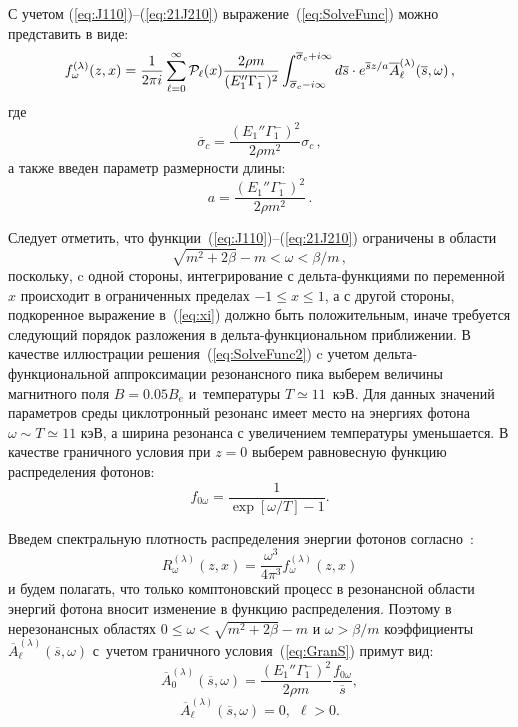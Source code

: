 \documentclass[14pt, russian]{article}
\begin{document}
С учетом (\ref{eq:J110})--(\ref{eq:21J210}) выражение~(\ref{eq:SolveFunc}) можно представить в виде:
\begin{equation}\label{eq:SolveFunc2}
	f_\omega^{(\lambda)}(z, x) = \frac{1}{2\pi i}\sum_{\ell=0}^{\infty} 
	{\cal P}_\ell(x) \frac{2\rho m}{(E_1''\Gamma_1^-)^2}\int_{\overline{\sigma}_c-i\infty}^{\overline{\sigma}_c + i \infty}d\overline{s} \cdot e^{\overline{s}z/a} \overline{A}^{(\lambda)}_\ell(\overline{s},\omega)\, ,
\end{equation}
где 
\begin{equation}
	\overline{\sigma}_c= \frac{(E_1''\Gamma_1^-)^2}{2\rho m^2} \sigma_c\, ,
\end{equation}
а также
введен параметр размерности длины:
\begin{equation}
	a=\frac{(E_1''\Gamma_1^-)^2}{2\rho m^ 2}\, .
\end{equation}

Следует отметить, что функции~(\ref{eq:J110})--(\ref{eq:21J210}) ограничены в области 
\begin{equation}
	\sqrt{m^2+2\beta}-m<\omega<\beta/m\, ,
\end{equation}
поскольку, c одной стороны, интегрирование с дельта-функциями по переменной~$x$ происходит в ограниченных пределах $-1\leqslant x\leqslant1$, а с другой стороны, подкоренное выражение в~(\ref{eq:xi}) должно быть положительным, иначе требуется следующий порядок разложения в дельта-функциональном приближении. В качестве иллюстрации решения~(\ref{eq:SolveFunc2}) c учетом дельта-функциональной аппроксимации резонансного пика выберем величины магнитного поля $B=0.05 B_e$ и~температуры $T\simeq11$~кэВ. Для данных значений параметров среды циклотронный резонанс имеет место на энергиях фотона $\omega\sim T\simeq11$ кэВ, а ширина резонанса с увеличением температуры уменьшается. В качестве граничного условия при $z=0$ выберем равновесную функцию распределения фотонов:
\begin{equation}
	f_{0\omega} = \frac{1}{\exp[\omega/T]-1}.
\end{equation}

 Введем спектральную плотность распределения энергии фотонов согласно~\cite{Landau:2002}:
\begin{equation}\label{eq:PowerSpectra}
	R_\omega^{(\lambda)}(z, x)=\frac{\omega^3}{4\pi^3} f_\omega^{(\lambda)}(z, x)
\end{equation}
и будем полагать, что только комптоновский процесс в резонансной области энергий фотона вносит изменение в функцию распределения. Поэтому  в нерезонансных областях $0\leqslant\omega <\sqrt{m^2+2\beta}-m$ и $\omega>\beta/m$ коэффициенты $\overline{A}^{(\lambda)}_\ell(\overline s,\omega)$ с~учетом граничного условия~(\ref{eq:GranS}) примут вид:
\begin{equation}
	\overline{A}_0^{(\lambda)}(\overline{s},\omega)=\frac{(E_1''\Gamma_1^-)^2}{2\rho m}\frac{f_{0\omega}}{\overline{s}},
\end{equation}
\begin{equation}
	\overline{A}_\ell^{(\lambda)}(\overline{s},\omega)=0, \, \, \ell>0.
\end{equation}
\end{document}
